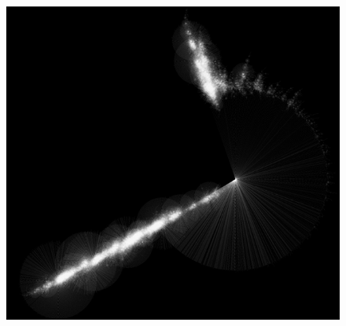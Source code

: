 		\begin{figure}[!h]
		\centering
		\includegraphics[width=\textwidth]{images/one_million_network.png}
		\end{figure}
